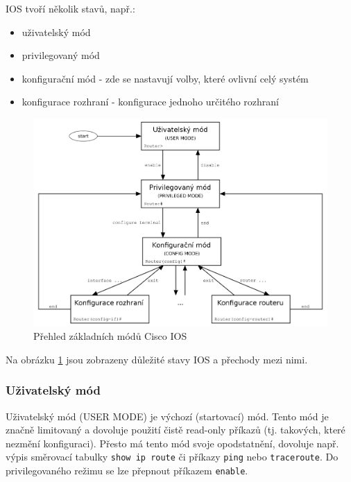 IOS tvoří několik stavů, např.:
\begin{itemize}
 \item uživatelský mód
 \item privilegovaný mód
 \item konfigurační mód - zde se nastavují volby, které ovlivní celý systém
 \item konfigurace rozhraní - konfigurace jednoho určitého rozhraní
\end{itemize}

\begin{figure}[h]
\begin{center}
\includegraphics[width=13cm]{figures/ios.png}
\caption{Přehled základních módů Cisco IOS \cite{wiki:ios}}
\label{fig:ios}
\end{center}
\end{figure}

Na obrázku \ref{fig:ios} jsou zobrazeny důležité stavy IOS a přechody mezi nimi. 


\subsubsection{Uživatelský mód}
Uživatelský mód (USER MODE) je výchozí (startovací) mód. Tento mód je značně limitovaný a dovoluje použití čistě read-only příkazů (tj. takových, které nezmění konfiguraci). Přesto má tento mód svoje opodstatnění, dovoluje např. výpis směrovací tabulky \verb|show ip route| či příkazy \verb|ping| nebo \verb|traceroute|. Do privilegovaného režimu se lze přepnout příkazem \verb|enable|.

